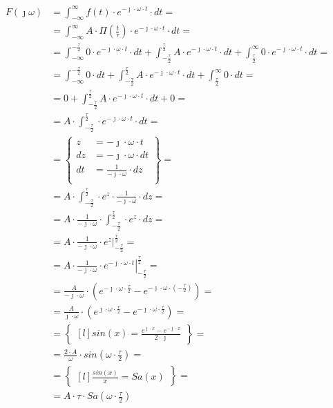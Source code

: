 \begin{task}

\begin{align*}
F(\jmath \omega )&=\int_{-\infty }^{\infty}f(t) \cdot e^{-\jmath \cdot \omega \cdot t}\cdot dt=\\
&=\int_{-\infty }^{\infty} A\cdot\Pi(\frac{t}{\tau})  \cdot e^{-\jmath \cdot \omega \cdot t}\cdot dt=\\
&=\int_{-\infty }^{-\frac{\tau}{2}} 0 \cdot e^{-\jmath \cdot \omega \cdot t}\cdot dt + \int_{-\frac{\tau}{2} }^{\frac{\tau}{2}} A\cdot e^{-\jmath \cdot \omega \cdot t}\cdot dt + \int_{\frac{\tau}{2} }^{\infty} 0\cdot e^{-\jmath \cdot \omega \cdot t}\cdot dt=\\
&=\int_{-\infty }^{-\frac{\tau}{2}} 0 \cdot dt + \int_{-\frac{\tau}{2} }^{\frac{\tau}{2}} A\cdot e^{-\jmath \cdot \omega \cdot t}\cdot dt + \int_{\frac{\tau}{2} }^{\infty} 0 \cdot dt=\\
&=0 + \int_{-\frac{\tau}{2} }^{\frac{\tau}{2}} A\cdot e^{-\jmath \cdot \omega \cdot t}\cdot dt + 0=\\
&=A\cdot \int_{-\frac{\tau}{2} }^{\frac{\tau}{2}} \cdot e^{-\jmath \cdot \omega \cdot t}\cdot dt=\\
&=\begin{Bmatrix}
z&=-\jmath \cdot \omega \cdot t\\
dz&=-\jmath \cdot \omega \cdot dt\\
dt&=\frac{1}{-\jmath \cdot \omega} \cdot dz\\
\end{Bmatrix}=\\
&=A\cdot \int_{-\frac{\tau}{2} }^{\frac{\tau}{2}} \cdot e^{z}\cdot \frac{1}{-\jmath \cdot \omega} \cdot dz=\\
&=A\cdot \frac{1}{-\jmath \cdot \omega} \cdot \int_{-\frac{\tau}{2} }^{\frac{\tau}{2}} \cdot e^{z}\cdot dz=\\
&=A\cdot \frac{1}{-\jmath \cdot \omega} \cdot \left. e^{z}\right|_{-\frac{\tau}{2} }^{\frac{\tau}{2}}=\\
&=A\cdot \frac{1}{-\jmath \cdot \omega} \cdot \left. e^{-\jmath \cdot \omega \cdot t}\right|_{-\frac{\tau}{2} }^{\frac{\tau}{2}}=\\
&=\frac{A}{-\jmath \cdot \omega} \cdot \left(e^{-\jmath \cdot \omega \cdot \frac{\tau}{2}} - e^{-\jmath \cdot \omega \cdot (-\frac{\tau}{2})}\right)=\\
&=\frac{A}{\jmath \cdot \omega} \cdot \left(e^{\jmath \cdot \omega \cdot \frac{\tau}{2}} - e^{-\jmath \cdot \omega \cdot \frac{\tau}{2}}\right)=\\
&=\begin{Bmatrix*}[l]
sin(x)=\frac{e^{\jmath \cdot x} - e^{-\jmath \cdot x}}{2 \cdot \jmath}
\end{Bmatrix*}=\\
&=\frac{2 \cdot A}{\omega} \cdot sin\left(\omega \cdot \frac{\tau}{2}\right)=\\
&=\begin{Bmatrix*}[l]
\frac{sin(x)}{x}=Sa(x)
\end{Bmatrix*}=\\
&=A\cdot \tau \cdot Sa\left(\omega \cdot \frac{\tau}{2}\right)
\end{align*}


\end{task}
